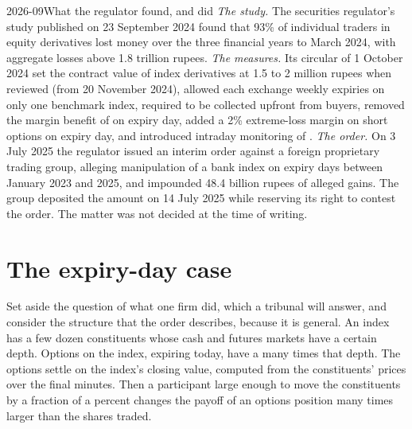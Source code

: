 \begin{dated}{2026-09}{What the regulator found, and did}\label{dat:m1:options-markets-europe-asia:sebi}
\emph{The study.} The securities regulator's study published on 23 September
2024 found that 93\% of individual traders in equity derivatives lost money
over the three financial years to March 2024, with aggregate losses above
1.8 trillion rupees.
\emph{The measures.} Its circular of 1 October 2024 set the contract value of
index derivatives at 1.5 to 2 million rupees when reviewed (from 20 November
2024), allowed each exchange weekly expiries on only one benchmark index,
required  to be collected upfront from buyers, removed the
margin benefit of  on expiry day, added a 2\% extreme-loss
margin on short options on expiry day, and introduced intraday monitoring of
.
\emph{The order.} On 3 July 2025 the regulator issued an interim order against
a foreign proprietary trading group, alleging manipulation of a bank index on
expiry days between January 2023 and 2025, and impounded 48.4 billion rupees
of alleged gains. The group deposited the amount on 14 July 2025 while
reserving its right to contest the order. The matter was not decided at the
time of writing.
\end{dated}

\section{The expiry-day case}

Set aside the question of what one firm did, which a tribunal will answer,
and consider the structure that the order describes, because it is general.
An index has a few dozen constituents whose cash and futures markets have a
certain depth. Options on the index, expiring today, have a 
many times that depth. The options settle on the index's closing value,
computed from the constituents' prices over the final minutes. Then a
participant large enough to move the constituents by a fraction of a percent
changes the payoff of an options position many times larger than the shares
traded.

